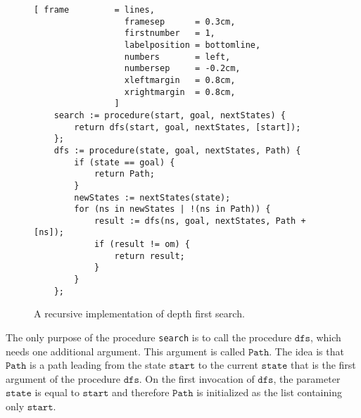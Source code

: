 \begin{figure}[!ht]
\centering
\begin{Verbatim}[ frame         = lines, 
                  framesep      = 0.3cm, 
                  firstnumber   = 1,
                  labelposition = bottomline,
                  numbers       = left,
                  numbersep     = -0.2cm,
                  xleftmargin   = 0.8cm,
                  xrightmargin  = 0.8cm,
                ]
    search := procedure(start, goal, nextStates) {
        return dfs(start, goal, nextStates, [start]);
    };    
    dfs := procedure(state, goal, nextStates, Path) {
        if (state == goal) {
            return Path;
        }
        newStates := nextStates(state);
        for (ns in newStates | !(ns in Path)) {
            result := dfs(ns, goal, nextStates, Path + [ns]);
            if (result != om) {
                return result;
            }   
        }
    };
\end{Verbatim}
\vspace*{-0.3cm}
\caption{A recursive implementation of depth first search.}
\label{fig:depth-first-search-recursive.stlx}
\end{figure}
The only purpose of the procedure \texttt{search} is to call the procedure $\mathtt{dfs}$, which needs one
additional argument.  This argument is called $\mathtt{Path}$.  The idea is that $\mathtt{Path}$ is
a path leading from the state $\mathtt{start}$ to the current $\mathtt{state}$ that is the first
argument of the procedure $\mathtt{dfs}$.  On the first invocation of $\mathtt{dfs}$, the
parameter $\mathtt{state}$ is equal to $\mathtt{start}$ and therefore $\mathtt{Path}$ is initialized
as the list containing only $\mathtt{start}$.

